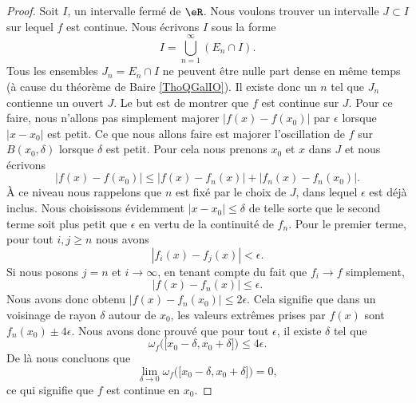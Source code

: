\begin{proof}
    Soit \( I\), un intervalle fermé de \( \eR\). Nous voulons trouver un intervalle \( J\subset I\) sur lequel \( f\) est continue. Nous écrivons \( I\) sous la forme 
    \begin{equation}
        I=\bigcup_{n=1}^{\infty}(E_n\cap I).
    \end{equation}
    Tous les ensembles \( J_n=E_n\cap I\) ne peuvent être nulle part dense en même temps (à cause du théorème de Baire \ref{ThoQGalIO}). Il existe donc un \( n\) tel que \( J_n\) contienne un ouvert \( J\). Le but est de montrer que \( f\) est continue sur \( J\). Pour ce faire, nous n'allons pas simplement majorer \( | f(x)-f(x_0) |\) par \( \epsilon\) lorsque \( | x-x_0 |\) est petit. Ce que nous allons faire est majorer l'oscillation de \( f\) sur \( B(x_0,\delta)\) lorsque \( \delta\) est petit. Pour cela nous prenons \( x_0\) et \( x\) dans \( J\) et nous écrivons
    \begin{equation}
        | f(x)-f(x_0) |\leq | f(x)-f_n(x) |+| f_n(x)-f_n(x_0) |.
    \end{equation}
    À ce niveau nous rappelons que \( n\) est fixé par le choix de \( J\), dans lequel \( \epsilon\) est déjà inclus. Nous choisissons évidemment \( | x-x_0 |\leq \delta\) de telle sorte que le second terme soit plus petit que \( \epsilon\) en vertu de la continuité de \( f_n\). Pour le premier terme, pour tout \( i,j\geq n\) nous avons
    \begin{equation}
        | f_i(x)-f_j(x) |<\epsilon.
    \end{equation}
    Si nous posons \( j=n\) et \( i\to\infty\), en tenant compte du fait que \( f_i\to f\) simplement,
    \begin{equation}
        | f(x)-f_n(x) |\leq \epsilon.
    \end{equation}
    Nous avons donc obtenu \( | f(x)-f_n(x_0) |\leq 2\epsilon\). Cela signifie que dans un voisinage de rayon \( \delta\) autour de \( x_0\), les valeurs extrêmes prises par \( f(x) \) sont \( f_n(x_0)\pm 4\epsilon\). Nous avons donc prouvé que pour tout \( \epsilon\), il existe \( \delta\) tel que
    \begin{equation}
        \omega_f\big( \mathopen[ x_0-\delta , x_0+\delta \mathclose] \big)\leq 4\epsilon.
    \end{equation}
    De là nous concluons que
    \begin{equation}
        \lim_{\delta\to 0}\omega_f\big( \mathopen[ x_0-\delta , x_0+\delta \mathclose] \big)=0,
    \end{equation}
    ce qui signifie que \( f\) est continue en \( x_0\).
\end{proof}

